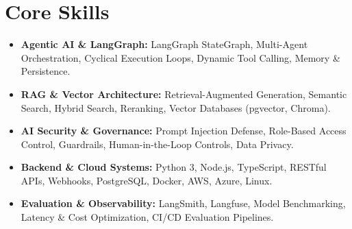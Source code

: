 \documentclass[a4paper,10pt]{article}
\begin{document}
\section{Core Skills}
\begin{itemize}
  \item \textbf{Agentic AI \& LangGraph:} LangGraph StateGraph, Multi-Agent Orchestration, Cyclical Execution Loops, Dynamic Tool Calling, Memory \& Persistence.
  \item \textbf{RAG \& Vector Architecture:} Retrieval-Augmented Generation, Semantic Search, Hybrid Search, Reranking, Vector Databases (pgvector, Chroma).
  \item \textbf{AI Security \& Governance:} Prompt Injection Defense, Role-Based Access Control, Guardrails, Human-in-the-Loop Controls, Data Privacy.
  \item \textbf{Backend \& Cloud Systems:} Python 3, Node.js, TypeScript, RESTful APIs, Webhooks, PostgreSQL, Docker, AWS, Azure, Linux.
  \item \textbf{Evaluation \& Observability:} LangSmith, Langfuse, Model Benchmarking, Latency \& Cost Optimization, CI/CD Evaluation Pipelines.
\end{itemize}
\end{document}
